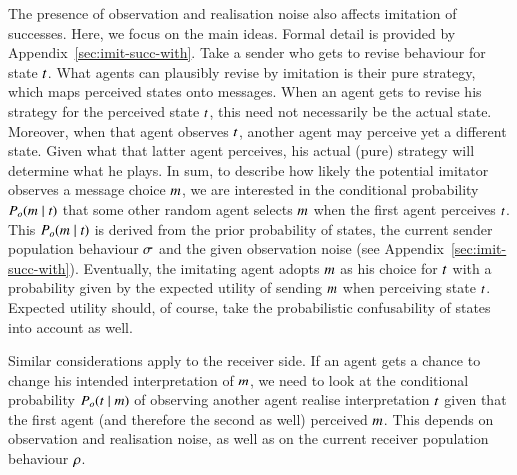 \documentclass[12pt,english]{article}
\numberwithin{equation}{section}
\begin{document}
The presence of observation and realisation noise also affects imitation of successes. Here, we
focus on the main ideas. Formal detail is provided by Appendix~\ref{sec:imit-succ-with}. Take a
sender who gets to revise behaviour for state $t$. What agents can plausibly revise by
imitation is their pure strategy, which maps perceived states onto messages. When an agent gets
to revise his strategy for the perceived state $t$, this need not necessarily be the
actual state. Moreover, when that agent observes $t$, another agent may perceive yet a
different state. Given what that latter agent perceives, his actual (pure) strategy will
determine what he plays. In sum, to describe how likely the potential imitator observes a
message choice $m$, we are interested in the conditional probability
$P_o(m \mid t)$ that some other random agent selects $m$ when the first
agent perceives $t$. This $P_o(m \mid t)$ is derived from the prior
probability of states, the current sender population behaviour $\sigma$ and the given
observation noise (see Appendix~\ref{sec:imit-succ-with}). Eventually, the imitating agent adopts
$m$ as his choice for $t$ with a probability given by the expected utility of sending
$m$ when perceiving state $t$. Expected utility should, of course, take the
probabilistic confusability of states into account as well.

Similar considerations apply to the receiver side. If an agent gets a chance to change his
intended interpretation of $m$, we need to look at the conditional probability
$P_o(t \mid m)$ of observing another agent realise interpretation $t$ given
that the first agent (and therefore the second as well) perceived $m$. This depends on
observation and realisation noise, as well as on the current receiver population behaviour
$\rho$.
\end{document}
